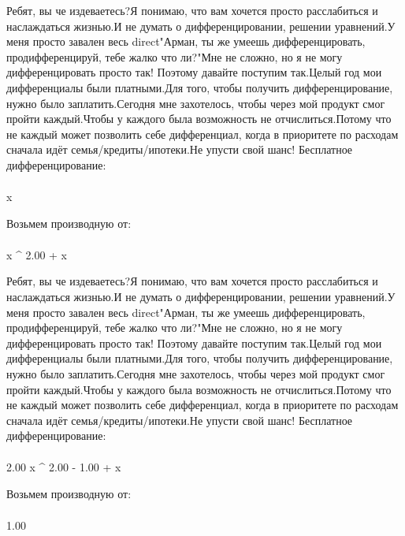 Ребят, вы че издеваетесь?Я понимаю, что вам хочется просто расслабиться и наслаждаться жизнью.И не думать о дифференцировании, решении уравнений.У меня просто завален весь direct"Арман, ты же умеешь дифференцировать, продифференцируй, тебе жалко что ли?"Мне не сложно, но я не могу дифференцировать просто так! Поэтому давайте поступим так.Целый год мои дифференциалы были платными.Для того, чтобы получить дифференцирование, нужно было заплатить.Сегодня мне захотелось, чтобы через мой продукт смог пройти каждый.Чтобы у каждого была возможность не отчислиться.Потому что не каждый может позволить себе дифференциал, когда в приоритете по расходам сначала идёт семья/кредиты/ипотеки.Не упусти свой шанс! Бесплатное дифференцирование: 
\begin{gather}
\end{gather}
\begin{}
\cos x  \\
\end{}
Возьмем производную от:
\begin{gather}
\end{gather}
\begin{}
x ^ {2.00 }+ \sin x \\
\end{}
Ребят, вы че издеваетесь?Я понимаю, что вам хочется просто расслабиться и наслаждаться жизнью.И не думать о дифференцировании, решении уравнений.У меня просто завален весь direct"Арман, ты же умеешь дифференцировать, продифференцируй, тебе жалко что ли?"Мне не сложно, но я не могу дифференцировать просто так! Поэтому давайте поступим так.Целый год мои дифференциалы были платными.Для того, чтобы получить дифференцирование, нужно было заплатить.Сегодня мне захотелось, чтобы через мой продукт смог пройти каждый.Чтобы у каждого была возможность не отчислиться.Потому что не каждый может позволить себе дифференциал, когда в приоритете по расходам сначала идёт семья/кредиты/ипотеки.Не упусти свой шанс! Бесплатное дифференцирование: 
\begin{gather}
\end{gather}
\begin{}
2.00  \cdot x ^ {2.00 - 1.00 }+ \cos x  \\
\end{}
Возьмем производную от:
\begin{gather}
\end{gather}
\begin{}
1.00 \\
\end{}
